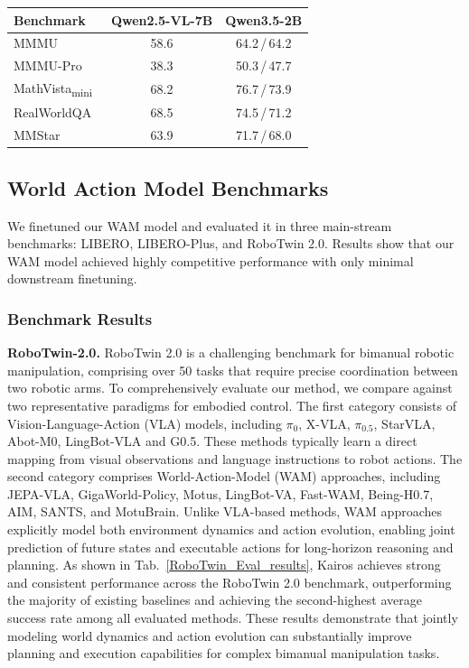 \documentclass{llmxive}
\begin{document}
\begin{table}[t]
\begin{minipage}[t]{0.48\textwidth}
{\begin{tabular}{l c c}
\toprule
\multirow{1}{*}{\textbf{Benchmark}} & \textbf{Qwen2.5-VL-7B} & \textbf{Qwen3.5-2B} \\
\midrule
MMMU~\cite{mmmu}            & 58.6 & 64.2\,/\,64.2 \\
MMMU-Pro~\cite{mmupro}        & 38.3 & 50.3\,/\,47.7 \\
MathVista\textsubscript{mini}~\cite{mathvista} & 68.2 & 76.7\,/\,73.9 \\
RealWorldQA~\cite{realworldqa}     & 68.5 & 74.5\,/\,71.2 \\
MMStar~\cite{mmstar}          & 63.9 & 71.7\,/\,68.0 \\
\bottomrule
\end{tabular}%
}
\end{minipage}
\end{table}


\subsection{World Action Model Benchmarks}
We finetuned our WAM model and evaluated it in three main-stream benchmarks: LIBERO, LIBERO-Plus, and RoboTwin 2.0. Results show that our WAM model achieved highly competitive performance with only minimal downstream finetuning.

\subsubsection{Benchmark Results}

\textbf{RoboTwin-2.0.} 
RoboTwin 2.0 \citep{chen2025robotwin} is a challenging benchmark for bimanual robotic manipulation, comprising over 50 tasks that require precise coordination between two robotic arms. To comprehensively evaluate our method, we compare against two representative paradigms for embodied control.
The first category consists of Vision-Language-Action (VLA) models, including $\pi_0$, X-VLA, $\pi_{0.5}$, StarVLA, Abot-M0, LingBot-VLA and G0.5. These methods typically learn a direct mapping from visual observations and language instructions to robot actions. The second category comprises World-Action-Model (WAM) approaches, including JEPA-VLA, GigaWorld-Policy, Motus, LingBot-VA, Fast-WAM, Being-H0.7, AIM, SANTS, and MotuBrain. Unlike VLA-based methods, WAM approaches explicitly model both environment dynamics and action evolution, enabling joint prediction of future states and executable actions for long-horizon reasoning and planning.
As shown in Tab.~\ref{RoboTwin_Eval_results}, Kairos achieves strong and consistent performance across the RoboTwin 2.0 benchmark, outperforming the majority of existing baselines and achieving the second-highest average success rate among all evaluated methods. These results demonstrate that jointly modeling world dynamics and action evolution can substantially improve planning and execution capabilities for complex bimanual manipulation tasks.
\end{document}
